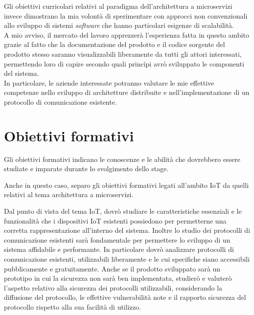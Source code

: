 Gli obiettivi curricolari relativi al paradigma dell'architettura a microservizi invece dimostrano la mia volontà di sperimentare con approcci non convenzionali allo sviluppo di sistemi \emph{software} che hanno particolari esigenze di scalabilità. \\
A mio avviso, il mercato del lavoro apprezzerà l'esperienza fatta in questo ambito grazie al fatto che la documentazione del prodotto e il codice sorgente del prodotto stesso saranno visualizzabili liberamente da tutti gli attori interessati, permettendo loro di capire secondo quali princìpi avrò sviluppato le componenti del sistema. \\
In particolare, le aziende interessate potranno valutare le mie effettive competenze nello sviluppo di architetture distribuite e nell'implementazione di un protocollo di comunicazione esistente.

\section{Obiettivi formativi}

Gli obiettivi formativi indicano le conoscenze e le abilità che dovrebbero essere studiate e imparate durante lo svolgimento dello stage.

Anche in questo caso, separo gli obiettivi formativi legati all'ambito IoT da quelli relativi al tema architettura a microservizi.

Dal punto di vista del tema IoT, dovrò studiare le caratteristiche essenziali e le funzionalità che i dispositivi IoT esistenti possiedono per permetterne una corretta rappresentazione all'interno del sistema.
Inoltre lo studio dei protocolli di comunicazione esistenti sarà fondamentale per permettere lo sviluppo di un sistema affidabile e performante. In particolare dovrò analizzare protocolli di comunicazione esistenti, utilizzabili liberamente e le cui specifiche siano accessibili pubblicamente e gratuitamente.
Anche se il prodotto sviluppato sarà un prototipo in cui la sicurezza non sarà ben implementata, studierò e valuterò l'aspetto relativo alla sicurezza dei protocolli utilizzabili, considerando la diffusione del protocollo, le effettive vulnerabilità note e il rapporto sicurezza del protocollo rispetto alla sua facilità di utilizzo.

